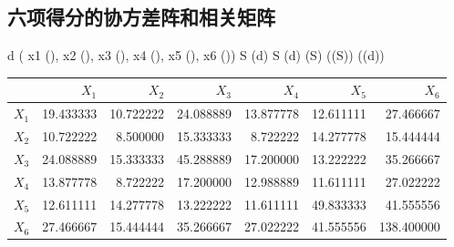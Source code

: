 \subsection{六项得分的协方差阵和相关矩阵}
\begin{code}
d \ROperator{<-} (
  x1 \ROperator{=} (),
  x2 \ROperator{=} (),
  x3 \ROperator{=} (),
  x4 \ROperator{=} (),
  x5 \ROperator{=} (),
  x6 \ROperator{=} ())
S \ROperator{<-} (d)
S
(d)
(S)
((S))
((d))
\end{code}
\par\addvspace{5pt}\begin{center}\begin{minipage}{\linewidth}\centering
\small
{}
\begin{tabular}{lrrrrrr}\toprule
 &{\bfseries  $X_1$ }&{\bfseries  $X_2$ }&{\bfseries  $X_3$ }&{\bfseries  $X_4$ }&{\bfseries  $X_5$ }&{\bfseries  $X_6$}\\\midrule
$X_1$ & 19.433333 & 10.722222 & 24.088889 & 13.877778 & 12.611111 & 27.466667\\
$X_2$ & 10.722222 & 8.500000 & 15.333333 & 8.722222 & 14.277778 & 15.444444\\
$X_3$ & 24.088889 & 15.333333 & 45.288889 & 17.200000 & 13.222222 & 35.266667\\
$X_4$ & 13.877778 & 8.722222 & 17.200000 & 12.988889 & 11.611111 & 27.022222\\
$X_5$ & 12.611111 & 14.277778 & 13.222222 & 11.611111 & 49.833333 & 41.555556\\
$X_6$ & 27.466667 & 15.444444 & 35.266667 & 27.022222 & 41.555556 & 138.400000\\
\bottomrule\end{tabular}
\end{minipage}\end{center}


